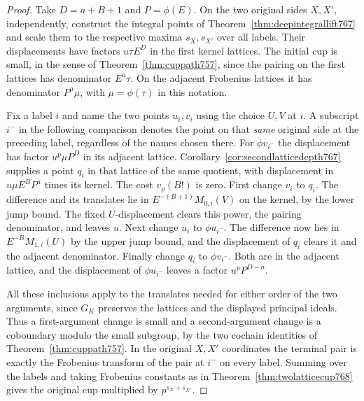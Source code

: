\documentclass[a4paper,11pt]{article}
\theoremstyle{definition}
\theoremstyle{remark}
\numberwithin{equation}{section}
\begin{document}
\begin{proof}
Take \(D=a+B+1\) and \(P=\phi(E)\). On the two original
sides \(X,X'\), independently, construct the integral points
of Theorem~\ref{thm:deepintegrallift767} and scale them to
the respective maxima \(s_X,s_{X'}\) over all labels. Their
displacements have factors \(u\tau E^D\) in the first kernel
lattices. The initial cup is small, in the sense of
Theorem~\ref{thm:cuppath757}, since the pairing on the first
lattices has denominator \(E^a\tau\). On the adjacent
Frobenius lattices it has denominator \(P^a\mu\), with
\(\mu=\phi(\tau)\) in this notation.

Fix a label \(i\) and name the two points \(u_i,v_i\) using
the choice \(U,V\) at \(i\). A subscript \(i^-\) in the
following comparison denotes the point on that \emph{same}
original side at the preceding label, regardless of the
names chosen there. For \(\phi v_{i^-}\) the displacement
has factor \(u^p\mu P^D\) in its adjacent lattice.
Corollary~\ref{cor:secondlatticedepth767} supplies a point
\(q_i\) in that lattice of the same quotient, with displacement
in \(u\mu E^B P^a\) times its kernel. The cost \(v_p(B!)\)
is zero. First change \(v_i\) to \(q_i\). The difference
and its translates lie in \(E^{-(B+1)}M_{0,i}(V)\) on the
kernel, by the lower jump bound. The fixed \(U\)-displacement
clears this power, the pairing denominator, and leaves \(u\).
Next change \(u_i\) to \(\phi u_{i^-}\). The difference now
lies in \(E^{-B}M_{1,i}(U)\) by the upper jump bound, and
the displacement of \(q_i\) clears it and the adjacent
denominator. Finally change \(q_i\) to \(\phi v_{i^-}\).
Both are in the adjacent lattice, and the displacement of
\(\phi u_{i^-}\) leaves a factor \(u^p P^{D-a}\).

All these inclusions apply to the translates needed for
either order of the two arguments, since \(G_K\) preserves
the lattices and the displayed principal ideals. Thus a
first-argument change is small and a second-argument
change is a coboundary modulo the small subgroup, by the
two cochain identities of Theorem~\ref{thm:cuppath757}.
In the original \(X,X'\) coordinates the terminal pair
is exactly the Frobenius transform of the pair at \(i^-\)
on every label. Summing over the labels and taking Frobenius
constants as in Theorem~\ref{thm:twolatticecup768} gives
the original cup multiplied by \(p^{s_X+s_{X'}}\).
\end{proof}
\end{document}
